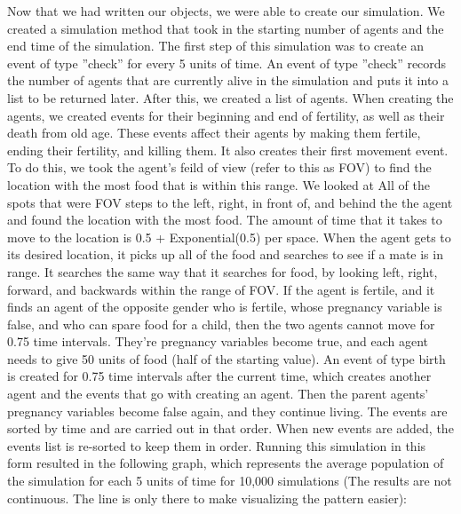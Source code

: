 \documentclass[11pt]{article}
\begin{document}
\begin{multicols}{2}
Now that we had written our objects, we were able to create our simulation. We created a simulation method that took in the starting number of agents and the end time of the simulation. The first step of this simulation was to create an event of type ''check'' for every 5 units of time. An event of type ''check'' records the number of agents that are currently alive in the simulation and puts it into a list to be returned later. \newline
After this, we created a list of agents. When creating the agents, we created events for their beginning and end of fertility, as well as their death from old age. These events affect their agents by making them fertile, ending their fertility, and killing them.
\newline
It also creates their first movement event. To do this, we took the agent's feild of view (refer to this as FOV) to find the location with the most food that is within this range. We looked at All of the spots that were FOV steps to the left, right, in front of, and behind the the agent and found the location with the most food. The amount of time that it takes to move to the location is 0.5 + Exponential(0.5) per space. When the agent gets to its desired location, it picks up all of the food and searches to see if a mate is in range. It searches the same way that it searches for food, by looking left, right, forward, and backwards within the range of FOV. If the agent is fertile, and it finds an agent of the opposite gender who is fertile, whose pregnancy variable is false, and who can spare food for a child, then the two agents cannot move for 0.75 time intervals. They're pregnancy variables become true, and each agent needs to give 50 units of food (half of the starting value). An event of type birth is created for 0.75 time intervals after the current time, which creates another agent and the events that go with creating an agent. Then the parent agents' pregnancy variables become false again, and they continue living. \newline
The events are sorted by time and are carried out in that order. When new events are added, the events list is re-sorted to keep them in order.
\newline
Running this simulation in this form resulted in the following graph, which represents the average population of the simulation for each 5 units of time for 10,000 simulations (The results are not continuous. The line is only there to make visualizing the pattern easier):\newline

\end{multicols}
\end{document}
